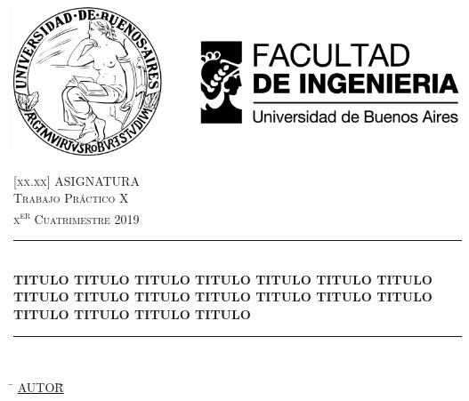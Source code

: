 
\fancyhf{}
\chead{}
\rfoot{}
\lfoot{}

\pagestyle{fancy}
\begin{titlepage}
	\newcommand{\HRule}{\rule{\linewidth}{0.5mm}} %
	\center %
	
	\thispagestyle{empty}
	\begin{center}
		\includegraphics[scale=0.9]{includes/banner_fiuba.pdf}\\
	\end{center}
	
	
	\textsc{\Large \textsc{[xx.xx] ASIGNATURA}}\\[0.3cm]
	\textsc{\Large \textsc{Trabajo Práctico X}}\\[0.3cm]
	\textsc{\large x\textsuperscript{er} Cuatrimestre 2019}\\[0.25cm]
	
	\HRule\\[0.2cm]
	{\large\bfseries TITULO TITULO TITULO TITULO TITULO TITULO TITULO TITULO TITULO TITULO TITULO TITULO TITULO TITULO TITULO TITULO TITULO TITULO}\\[0.2cm]
	\HRule\\[0.2cm]
	
	\begin{tabbing}
		\hspace{2cm}\=\+
		\underline{AUTOR}\hspace{-1cm}\=\+\hspace{1cm}\=\hspace{6cm}\=\\[0.2cm]
		

\end{tabbing}
\end{titlepage}
